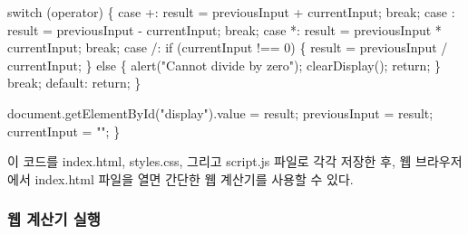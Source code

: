 \documentclass[
  letterpaper,
]{book}
\newenvironment{Shaded}{\begin{snugshade}}{\end{snugshade}}
\newcommand{\AttributeTok}[1]{\textcolor[rgb]{0.40,0.45,0.13}{#1}}
\newcommand{\BuiltInTok}[1]{\textcolor[rgb]{0.00,0.23,0.31}{#1}}
\newcommand{\ControlFlowTok}[1]{\textcolor[rgb]{0.00,0.23,0.31}{#1}}
\newcommand{\DecValTok}[1]{\textcolor[rgb]{0.68,0.00,0.00}{#1}}
\newcommand{\FunctionTok}[1]{\textcolor[rgb]{0.28,0.35,0.67}{#1}}
\newcommand{\NormalTok}[1]{\textcolor[rgb]{0.00,0.23,0.31}{#1}}
\newcommand{\OperatorTok}[1]{\textcolor[rgb]{0.37,0.37,0.37}{#1}}
\newcommand{\StringTok}[1]{\textcolor[rgb]{0.13,0.47,0.30}{#1}}
\begin{document}
\begin{tcolorbox}
\begin{Shaded}
\begin{Highlighting}[]
  \ControlFlowTok{switch}\NormalTok{ (operator) \{}
    \ControlFlowTok{case} \StringTok{\textquotesingle{}+\textquotesingle{}}\OperatorTok{:}
\NormalTok{      result }\OperatorTok{=}\NormalTok{ previousInput }\OperatorTok{+}\NormalTok{ currentInput}\OperatorTok{;}
      \ControlFlowTok{break}\OperatorTok{;}
    \ControlFlowTok{case} \StringTok{\textquotesingle{}{-}\textquotesingle{}}\OperatorTok{:}
\NormalTok{      result }\OperatorTok{=}\NormalTok{ previousInput }\OperatorTok{{-}}\NormalTok{ currentInput}\OperatorTok{;}
      \ControlFlowTok{break}\OperatorTok{;}
    \ControlFlowTok{case} \StringTok{\textquotesingle{}*\textquotesingle{}}\OperatorTok{:}
\NormalTok{      result }\OperatorTok{=}\NormalTok{ previousInput }\OperatorTok{*}\NormalTok{ currentInput}\OperatorTok{;}
      \ControlFlowTok{break}\OperatorTok{;}
    \ControlFlowTok{case} \StringTok{\textquotesingle{}/\textquotesingle{}}\OperatorTok{:}
      \ControlFlowTok{if}\NormalTok{ (currentInput }\OperatorTok{!==} \DecValTok{0}\NormalTok{) \{}
\NormalTok{        result }\OperatorTok{=}\NormalTok{ previousInput }\OperatorTok{/}\NormalTok{ currentInput}\OperatorTok{;}
\NormalTok{      \} }\ControlFlowTok{else}\NormalTok{ \{}
        \FunctionTok{alert}\NormalTok{(}\StringTok{"Cannot divide by zero"}\NormalTok{)}\OperatorTok{;}
        \FunctionTok{clearDisplay}\NormalTok{()}\OperatorTok{;}
        \ControlFlowTok{return}\OperatorTok{;}
\NormalTok{      \}}
      \ControlFlowTok{break}\OperatorTok{;}
    \ControlFlowTok{default}\OperatorTok{:}
      \ControlFlowTok{return}\OperatorTok{;}
\NormalTok{  \}}

  \BuiltInTok{document}\OperatorTok{.}\FunctionTok{getElementById}\NormalTok{(}\StringTok{"display"}\NormalTok{)}\OperatorTok{.}\AttributeTok{value} \OperatorTok{=}\NormalTok{ result}\OperatorTok{;}
\NormalTok{  previousInput }\OperatorTok{=}\NormalTok{ result}\OperatorTok{;}
\NormalTok{  currentInput }\OperatorTok{=} \StringTok{""}\OperatorTok{;}
\NormalTok{\}}
\end{Highlighting}
\end{Shaded}

이 코드를 index.html, styles.css, 그리고 script.js 파일로 각각 저장한
후, 웹 브라우저에서 index.html 파일을 열면 간단한 웹 계산기를 사용할 수
있다.

\end{tcolorbox}

\hypertarget{uxc6f9-uxacc4uxc0b0uxae30-uxc2e4uxd589}{%
\subsubsection{웹 계산기
실행}\label{uxc6f9-uxacc4uxc0b0uxae30-uxc2e4uxd589}}
\end{document}
